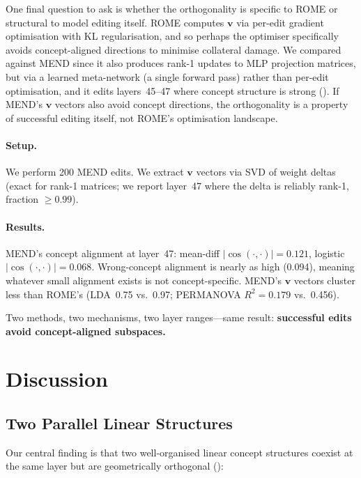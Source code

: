 \documentclass[11pt,a4paper]{article}
\newcommand{\vv}{\mathbf{v}}
\newcommand{\abs}[1]{\lvert #1 \rvert}
\newcommand{\cosim}{\abs{\cos(\cdot,\cdot)}}
\begin{document}
One final question to ask is whether the orthogonality is specific to ROME or structural to model editing itself.
ROME computes $\vv$ via per-edit gradient optimisation with KL regularisation, and so perhaps the optimiser specifically avoids concept-aligned directions to minimise collateral damage.
We compared against MEND \citep{mitchell2022fast} since it also produces rank-1 updates to MLP projection matrices, but via a learned meta-network (a single forward pass) rather than per-edit optimisation, and it edits layers~45--47 where concept structure is strong ().
If MEND's $\vv$ vectors also avoid concept directions, the orthogonality is a property of successful editing itself, not ROME's optimisation landscape.

\paragraph{Setup.}
We perform 200 MEND edits. We extract $\vv$ vectors via SVD of weight deltas (exact for rank-1 matrices; we report layer~47 where the delta is reliably rank-1, fraction $\geq 0.99$).

\paragraph{Results.}
MEND's concept alignment at layer~47: mean-diff $\cosim = 0.121$, logistic $\cosim = 0.068$.
Wrong-concept alignment is nearly as high (0.094), meaning whatever small alignment exists is not concept-specific.
MEND's $\vv$ vectors cluster less than ROME's (LDA~0.75 vs.~0.97; PERMANOVA $R^2 = 0.179$ vs.\ 0.456).

Two methods, two mechanisms, two layer ranges---same result: \textbf{successful edits avoid concept-aligned subspaces.}


\section{Discussion}
\label{sec:discussion}

\subsection{Two Parallel Linear Structures}

Our central finding is that two well-organised linear concept structures coexist at the same layer but are geometrically orthogonal ():
\end{document}

